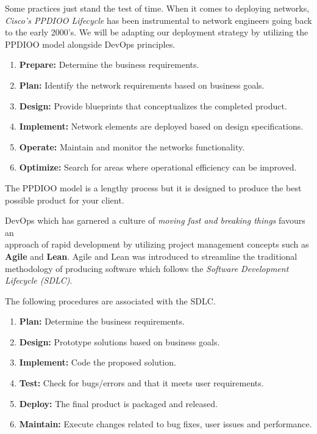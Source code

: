 \documentclass[12pt, letterpaper]{article}
\begin{document}
Some practices just stand the test of time. When it comes to deploying networks, \textit{Cisco's PPDIOO Lifecycle} has been instrumental to network engineers going back to the early 2000's. We will be adapting our deployment strategy by utilizing the PPDIOO model alongside DevOps principles.

\smallskip

\begin{enumerate}
\item \textbf{Prepare:} Determine the business requirements.
\item \textbf{Plan:} Identify the network requirements based on business goals.
\item \textbf{Design:} Provide blueprints that conceptualizes the completed product.
\item \textbf{Implement:} Network elements are deployed based on design specifications.
\item \textbf{Operate:} Maintain and monitor the networks functionality.
\item \textbf{Optimize:} Search for areas where operational efficiency can be improved.
\end{enumerate}

\smallskip

The PPDIOO model is a lengthy process but it is designed to produce the best possible product for your client.

\smallskip

DevOps which has garnered a culture of \textit{moving fast and breaking things} favours an \\ approach of rapid development by utilizing project management concepts such as \\ \textbf{Agile} and \textbf{Lean}. Agile and Lean was introduced to streamline the traditional methodology of producing software which follows the \textit{Software Development Lifecycle (SDLC)}.

The following procedures are associated with the SDLC.

\begin{enumerate}
\item \textbf{Plan:} Determine the business requirements.
\item \textbf{Design:} Prototype solutions based on business goals.
\item \textbf{Implement:} Code the proposed solution.
\item \textbf{Test:} Check for bugs/errors and that it meets user requirements.
\item \textbf{Deploy:} The final product is packaged and released.
\item \textbf{Maintain:} Execute changes related to bug fixes, user issues and performance.
\end{enumerate}
\end{document}
